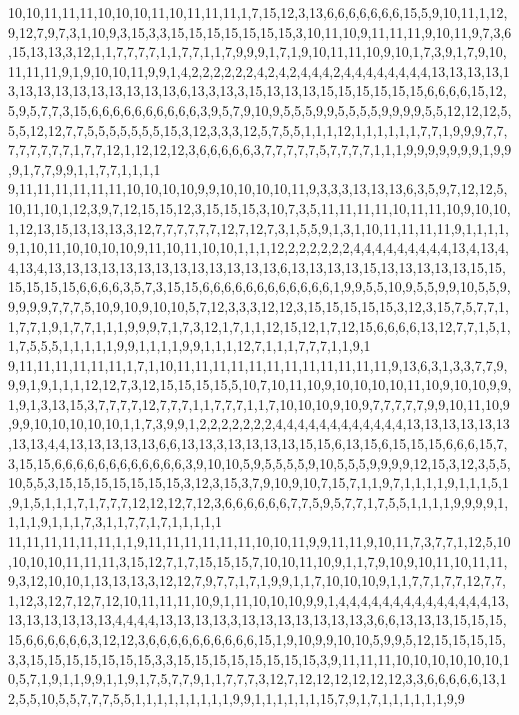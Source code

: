 10,10,11,11,11,10,10,10,11,10,11,11,11,1,7,15,12,3,13,6,6,6,6,6,6,6,15,5,9,10,11,1,12,9,12,7,9,7,3,1,10,9,3,15,3,3,15,15,15,15,15,15,15,3,10,11,10,9,11,11,11,9,10,11,9,7,3,6,15,13,13,3,12,1,1,7,7,7,7,1,1,7,7,1,1,7,9,9,9,1,7,1,9,10,11,11,10,9,10,1,7,3,9,1,7,9,10,11,11,11,9,1,9,10,10,11,9,9,1,4,2,2,2,2,2,2,4,2,4,2,4,4,4,2,4,4,4,4,4,4,4,4,13,13,13,13,13,13,13,13,13,13,13,13,13,13,6,13,3,13,3,15,13,13,13,15,15,15,15,15,15,6,6,6,6,15,12,5,9,5,7,7,3,15,6,6,6,6,6,6,6,6,6,6,3,9,5,7,9,10,9,5,5,5,9,9,5,5,5,5,9,9,9,9,5,5,12,12,12,5,5,5,12,12,7,7,5,5,5,5,5,5,5,15,3,12,3,3,3,12,5,7,5,5,1,1,1,12,1,1,1,1,1,1,7,7,1,9,9,9,7,7,7,7,7,7,7,7,1,7,7,12,1,12,12,12,3,6,6,6,6,6,3,7,7,7,7,7,5,7,7,7,7,1,1,1,9,9,9,9,9,9,9,1,9,9,9,1,7,7,9,9,1,1,7,7,1,1,1,1
9,11,11,11,11,11,11,10,10,10,10,9,9,10,10,10,10,11,9,3,3,3,13,13,13,6,3,5,9,7,12,12,5,10,11,10,1,12,3,9,7,12,15,15,12,3,15,15,15,3,10,7,3,5,11,11,11,11,10,11,11,10,9,10,10,1,12,13,15,13,13,13,3,12,7,7,7,7,7,7,12,7,12,7,3,1,5,5,9,1,3,1,10,11,11,11,11,9,1,1,1,1,9,1,10,11,10,10,10,10,9,11,10,11,10,10,1,1,1,12,2,2,2,2,2,2,4,4,4,4,4,4,4,4,4,13,4,13,4,4,13,4,13,13,13,13,13,13,13,13,13,13,13,13,13,6,13,13,13,13,15,13,13,13,13,13,15,15,15,15,15,15,6,6,6,6,3,5,7,3,15,15,6,6,6,6,6,6,6,6,6,6,6,6,1,9,9,5,5,10,9,5,5,9,9,10,5,5,9,9,9,9,9,7,7,7,5,10,9,10,9,10,10,5,7,12,3,3,3,12,12,3,15,15,15,15,15,3,12,3,15,7,5,7,7,1,1,7,7,1,9,1,7,7,1,1,1,9,9,9,7,1,7,3,12,1,7,1,1,12,15,12,1,7,12,15,6,6,6,6,13,12,7,7,1,5,1,1,7,5,5,5,1,1,1,1,1,9,9,1,1,1,1,9,9,1,1,1,12,7,1,1,1,7,7,7,1,1,9,1
9,11,11,11,11,11,11,1,7,1,10,11,11,11,11,11,11,11,11,11,11,11,11,9,13,6,3,1,3,3,7,7,9,9,9,1,9,1,1,1,12,12,7,3,12,15,15,15,15,5,10,7,10,11,10,9,10,10,10,10,11,10,9,10,10,9,9,1,9,1,3,13,15,3,7,7,7,7,12,7,7,7,1,1,7,7,7,1,1,7,10,10,10,9,10,9,7,7,7,7,7,9,9,10,11,10,9,9,9,10,10,10,10,10,1,1,7,3,9,9,1,2,2,2,2,2,2,2,4,4,4,4,4,4,4,4,4,4,4,4,13,13,13,13,13,13,13,13,4,4,13,13,13,13,13,6,6,13,13,3,13,13,13,13,15,15,6,13,15,6,15,15,15,6,6,6,15,7,3,15,15,6,6,6,6,6,6,6,6,6,6,6,6,3,9,10,10,5,9,5,5,5,5,9,10,5,5,5,9,9,9,9,12,15,3,12,3,5,5,10,5,5,3,15,15,15,15,15,15,15,3,12,3,15,3,7,9,10,9,10,7,15,7,1,1,9,7,1,1,1,1,9,1,1,1,5,1,9,1,5,1,1,1,7,1,7,7,7,12,12,12,7,12,3,6,6,6,6,6,6,7,7,5,9,5,7,7,1,7,5,5,1,1,1,1,9,9,9,9,1,1,1,1,9,1,1,1,7,3,1,1,7,7,1,7,1,1,1,1,1
11,11,11,11,11,11,1,1,9,11,11,11,11,11,11,10,10,11,9,9,11,11,9,10,11,7,3,7,7,1,12,5,10,10,10,10,11,11,11,3,15,12,7,1,7,15,15,15,7,10,10,11,10,9,1,1,7,9,10,9,10,11,10,11,11,9,3,12,10,10,1,13,13,13,3,12,12,7,9,7,7,1,7,1,9,9,1,1,7,10,10,10,9,1,1,7,7,1,7,7,12,7,7,1,12,3,12,7,12,7,12,10,11,11,11,10,9,1,11,10,10,10,9,9,1,4,4,4,4,4,4,4,4,4,4,4,4,4,4,13,13,13,13,13,13,13,4,4,4,4,13,13,13,13,3,13,13,13,13,13,13,13,3,6,6,13,13,13,15,15,15,15,6,6,6,6,6,6,3,12,12,3,6,6,6,6,6,6,6,6,6,6,15,1,9,10,9,9,10,10,5,9,9,5,12,15,15,15,15,3,3,15,15,15,15,15,15,15,3,3,15,15,15,15,15,15,15,15,3,9,11,11,11,10,10,10,10,10,10,10,5,7,1,9,1,1,9,9,1,1,9,1,7,5,7,7,9,1,1,7,7,7,3,12,7,12,12,12,12,12,12,3,3,6,6,6,6,6,13,12,5,5,10,5,5,7,7,7,5,5,1,1,1,1,1,1,1,1,1,9,9,1,1,1,1,1,1,15,7,9,1,7,1,1,1,1,1,1,9,9
